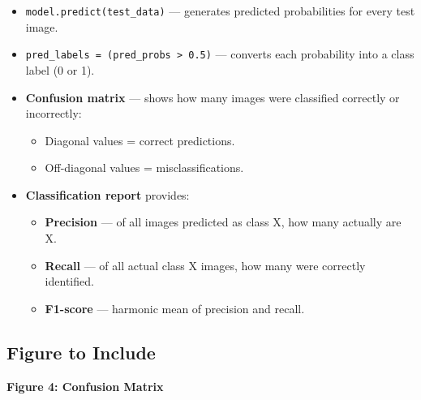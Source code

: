 \documentclass[12pt]{article}
\begin{document}
\begin{itemize}
    \item \texttt{model.predict(test\_data)} --- generates predicted probabilities for every test image.
    \item \texttt{pred\_labels = (pred\_probs > 0.5)} --- converts each probability into a class label (0 or 1).
    \item \textbf{Confusion matrix} --- shows how many images were classified correctly or incorrectly:
        \begin{itemize}
            \item Diagonal values = correct predictions.
            \item Off-diagonal values = misclassifications.
        \end{itemize}
    \item \textbf{Classification report} provides:
        \begin{itemize}
            \item \textbf{Precision} --- of all images predicted as class X, how many actually are X.
            \item \textbf{Recall} --- of all actual class X images, how many were correctly identified.
            \item \textbf{F1-score} --- harmonic mean of precision and recall.
        \end{itemize}
\end{itemize}

\subsection*{Figure to Include}

\textbf{Figure 4: Confusion Matrix}
\end{document}
